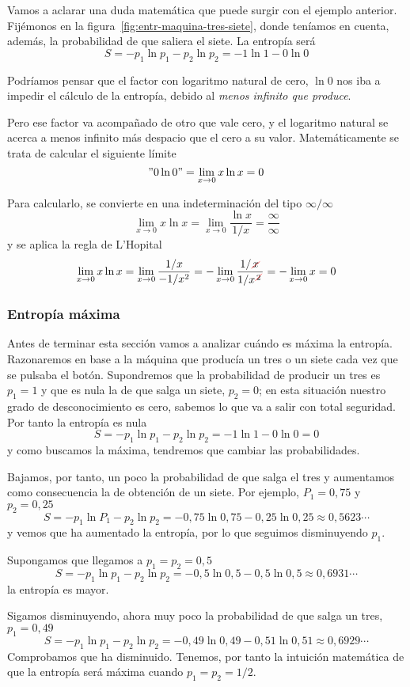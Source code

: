 Vamos a aclarar una duda matemática que puede surgir con el ejemplo anterior.
Fijémonos en la figura~\ref{fig:entr-maquina-tres-siete}, donde teníamos
en cuenta, además, la probabilidad de que saliera el siete.
La entropía será
\[
  S = -p_1\ln p_1 - p_2\ln p_2 = -1\ln 1 - 0\ln 0
\]

Podríamos pensar que el factor con logaritmo natural de cero, $\ln 0$ nos iba a
impedir el cálculo de la entropía, debido al \emph{menos infinito que produce}.

Pero ese factor va acompañado de otro que vale cero, y el logaritmo natural
se acerca a menos infinito más despacio que el cero a su valor.
Matemáticamente se trata de calcular el siguiente límite
\[
  "0\ln 0" = \lim_{x\to 0} x\ln x = 0
\]

Para calcularlo, se convierte en una indeterminación del tipo $\infty/\infty$
\[
  \lim_{x\to 0} x\ln x = \lim_{x\to 0} \frac{\ln x}{1/x} = \frac{\infty}{\infty}
\]
y se aplica la regla de L'Hopital
\[
  \lim_{x\to 0} x\ln x
  = \lim_{x\to 0} \frac{1/x}{-1/x^2}
  = - \lim_{x\to 0} \frac{1/\cancelout{x}}{1/x^{\cancelout{\scriptstyle 2}}}
  = -\lim_{x\to 0} x = 0
\]

\subsubsection{Entropía máxima}
Antes de terminar esta sección vamos a analizar cuándo es máxima la entropía.
Razonaremos en base a la máquina que producía un tres o un siete cada vez
que se pulsaba el botón. Supondremos que la probabilidad de producir un tres
es $p_1=1$ y que es nula la de que salga un siete, $p_2=0$; en esta situación
nuestro grado de desconocimiento es cero, sabemos lo que va a salir con
total seguridad. Por tanto la entropía es nula
\[
  S = -p_1\ln p_1 - p_2\ln p_2 = -1\ln 1 - 0\ln 0 = 0
\]
y como buscamos la máxima, tendremos que cambiar las probabilidades.

Bajamos, por tanto,  un poco la probabilidad de que salga el tres y
aumentamos como consecuencia la de obtención de un siete. Por ejemplo,
$P_1=0,75$ y $p_2=0,25$
\[
  S = -p_1\ln P_1 - p_2\ln p_2 = -0,75\ln 0,75 - 0,25\ln 0,25
  \approx 0,5623\cdots
\]
y vemos que ha aumentado la entropía, por lo que seguimos disminuyendo $p_1$.

Supongamos que llegamos a $p_1 = p_2 = 0,5$
\[
  S = -p_1\ln p_1 - p_2\ln p_2 = -0,5\ln 0,5 - 0,5\ln 0,5
  \approx 0,6931\cdots
\]
la entropía es mayor.

Sigamos disminuyendo, ahora muy poco la probabilidad de que salga un tres,
$p_1=0,49$
\[
  S = -p_1\ln p_1 - p_2\ln p_2 = -0,49\ln 0,49 - 0,51\ln 0,51
  \approx 0,6929\cdots  
\]
Comprobamos que ha disminuido. Tenemos, por tanto la intuición matemática
de que la entropía será máxima cuando $p_1=p_2 = 1/2$.

